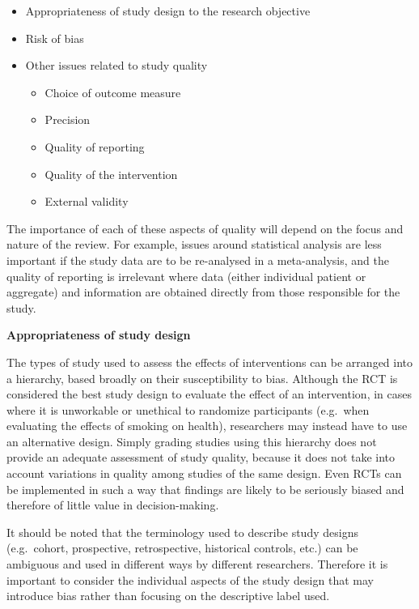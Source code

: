 \documentclass[
  11pt,
  a4paper,
  DIV=11,
  numbers=noendperiod]{scrreprt}
\begin{document}
\begin{itemize}
\item
  Appropriateness of study design to the research objective
\item
  Risk of bias
\item
  Other issues related to study quality

  \begin{itemize}
  \item
    Choice of outcome measure
  \item
    Precision
  \item
    Quality of reporting
  \item
    Quality of the intervention
  \item
    External validity
  \end{itemize}
\end{itemize}

The importance of each of these aspects of quality will depend on the
focus and nature of the review. For example, issues around statistical
analysis are less important if the study data are to be re-analysed in a
meta-analysis, and the quality of reporting is irrelevant where data
(either individual patient or aggregate) and information are obtained
directly from those responsible for the study.

\textbf{Appropriateness of study design}

The types of study used to assess the effects of interventions can be
arranged into a hierarchy, based broadly on their susceptibility to
bias. Although the RCT is considered the best study design to evaluate
the effect of an intervention, in cases where it is unworkable or
unethical to randomize participants (e.g.~when evaluating the effects of
smoking on health), researchers may instead have to use an alternative
design. Simply grading studies using this hierarchy does not provide an
adequate assessment of study quality, because it does not take into
account variations in quality among studies of the same design. Even
RCTs can be implemented in such a way that findings are likely to be
seriously biased and therefore of little value in decision-making.

It should be noted that the terminology used to describe study designs
(e.g.~cohort, prospective, retrospective, historical controls, etc.) can
be ambiguous and used in different ways by different researchers.
Therefore it is important to consider the individual aspects of the
study design that may introduce bias rather than focusing on the
descriptive label used.
\end{document}
